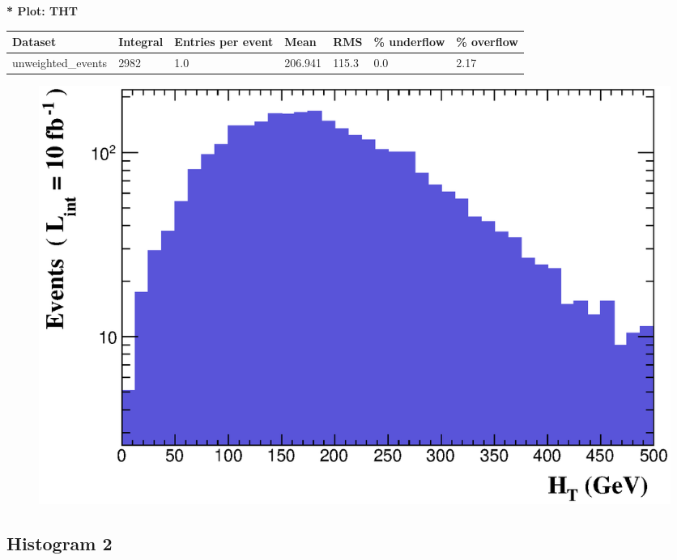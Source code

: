 \documentclass[a4paper, 10pt]{article}
\begin{document}
\textbf{* Plot: THT}\\
   \begin{table}[H]
  \begin{center}
    \begin{tabular}{|m{23.0mm}|m{23.0mm}|m{18.0mm}|m{19.0mm}|m{19.0mm}|m{19.0mm}|m{19.0mm}|}
      \hline
      {\cellcolor{yellow}         Dataset}& {\cellcolor{yellow}         Integral}& {\cellcolor{yellow}         Entries per event}& {\cellcolor{yellow}         Mean}& {\cellcolor{yellow}         RMS}& {\cellcolor{yellow}         \% underflow}& {\cellcolor{yellow}         \% overflow}\\
      \hline
      {\cellcolor{white}         unweighted\_events}& {\cellcolor{white}         2982}& {\cellcolor{white}         1.0}& {\cellcolor{white}         206.941}& {\cellcolor{white}         115.3}& {\cellcolor{green}         0.0}& {\cellcolor{green}         2.17}\\
\hline
    \end{tabular}
  \end{center}
\end{table}

\begin{figure}[H]
  \begin{center}
    \includegraphics[scale=0.45]{selection_0.eps}\\
\caption{   }
  \end{center}
\end{figure}
      \newpage
\subsection{ Histogram 2}
\end{document}
